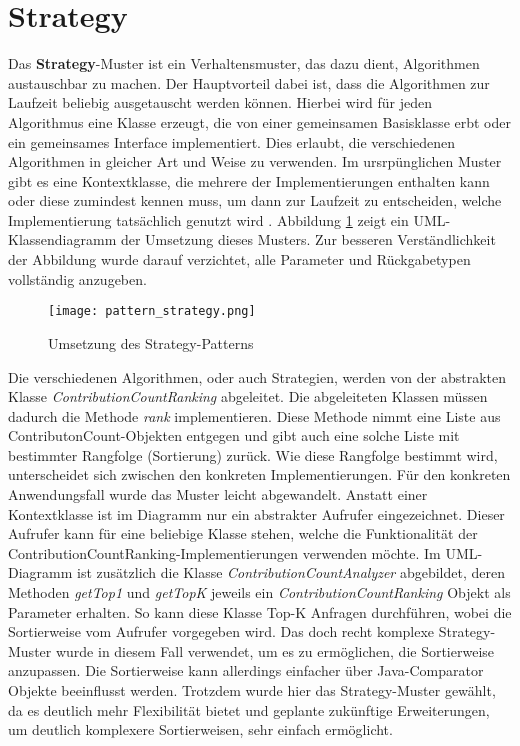 \newpage
\section{Strategy}

Das \textbf{Strategy}-Muster ist ein Verhaltensmuster, das dazu dient, Algorithmen austauschbar zu machen.
Der Hauptvorteil dabei ist, dass die Algorithmen zur Laufzeit beliebig ausgetauscht werden können.
Hierbei wird für jeden Algorithmus eine Klasse erzeugt, die von einer gemeinsamen Basisklasse erbt oder ein gemeinsames Interface implementiert.
Dies erlaubt, die verschiedenen Algorithmen in gleicher Art und Weise zu verwenden.
Im ursrpünglichen Muster gibt es eine Kontextklasse, die mehrere der Implementierungen enthalten kann oder diese zumindest kennen muss, um dann zur Laufzeit zu entscheiden, welche Implementierung tatsächlich genutzt wird \cite[pp.~343--351]{geirhos2015entwurfsmuster}.
\newline
Abbildung \ref{fig:pattern_strategy} zeigt ein UML-Klassendiagramm der Umsetzung dieses Musters.
Zur besseren Verständlichkeit der Abbildung wurde darauf verzichtet, alle Parameter und Rückgabetypen vollständig anzugeben.
\begin{figure}
    \texttt{[image: pattern\_strategy.png]}
    \centering
    \caption{Umsetzung des Strategy-Patterns}
    \label{fig:pattern_strategy}
\end{figure}
\newline
Die verschiedenen Algorithmen, oder auch Strategien, werden von der abstrakten Klasse \textit{ContributionCountRanking} abgeleitet.
Die abgeleiteten Klassen müssen dadurch die Methode \textit{rank} implementieren.
Diese Methode nimmt eine Liste aus ContributonCount-Objekten entgegen und gibt auch eine solche Liste mit bestimmter Rangfolge (Sortierung) zurück.
Wie diese Rangfolge bestimmt wird, unterscheidet sich zwischen den konkreten Implementierungen.
\newline
Für den konkreten Anwendungsfall wurde das Muster leicht abgewandelt.
Anstatt einer Kontextklasse ist im Diagramm nur ein abstrakter Aufrufer eingezeichnet.
Dieser Aufrufer kann für eine beliebige Klasse stehen, welche die Funktionalität der ContributionCountRanking-Implementierungen verwenden möchte.
Im UML-Diagramm ist zusätzlich die Klasse \textit{ContributionCountAnalyzer} abgebildet, deren Methoden \textit{getTop1} und \textit{getTopK} jeweils ein \textit{ContributionCountRanking} Objekt als Parameter erhalten.
So kann diese Klasse Top-K Anfragen durchführen, wobei die Sortierweise vom Aufrufer vorgegeben wird.
\newline
\newline
Das doch recht komplexe Strategy-Muster wurde in diesem Fall verwendet, um es zu ermöglichen, die Sortierweise anzupassen.
Die Sortierweise kann allerdings einfacher über Java-Comparator Objekte beeinflusst werden.
Trotzdem wurde hier das Strategy-Muster gewählt, da es deutlich mehr Flexibilität bietet und geplante zukünftige Erweiterungen, um deutlich komplexere Sortierweisen, sehr einfach ermöglicht.
